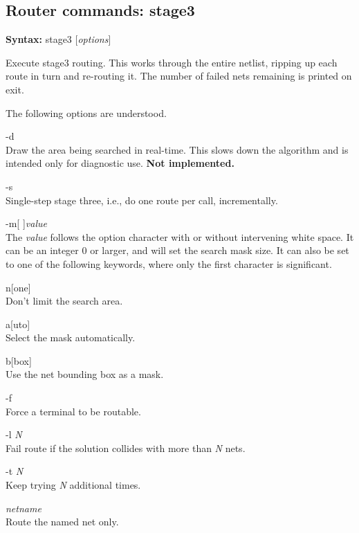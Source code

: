 \subsection{Router commands: {\vt stage3}}

{\bf Syntax:} {\vt stage3} [{\it options\/}]

Execute stage3 routing.  This works through the entire netlist,
ripping up each route in turn and re-routing it.  The number of failed
nets remaining is printed on exit.

The following options are understood.
\begin{description}
\item{\vt -d}\\
Draw the area being searched in real-time.  This slows down the
algorithm and is intended only for diagnostic use.  {\bf Not
implemented.}

\item{\vt -s}\\
Single-step stage three, i.e., do one route per call, incrementally.

\item{\vt -m}[ ]{\it value}\\
The {\it value} follows the option character with or without
intervening white space.  It can be an integer 0 or larger, and will
set the search mask size.  It can also be set to one of the following
keywords, where only the first character is significant.
\begin{description}
\item{\vt n}[{\vt one}]\\
Don't limit the search area.
\item{\vt a}[{\vt uto}]\\
Select the mask automatically.
\item{\vt b}[{\vt box}]\\
Use the net bounding box as a mask.
\end{description}

\item{\vt -f}\\
Force a terminal to be routable.

\item{\vt -l} {\it N}\\
Fail route if the solution collides with more than {\it N} nets.

\item{\vt -t} {\it N}\\
Keep trying {\it N} additional times.

\item{\it netname}\\
Route the named net only.
\end{description}

